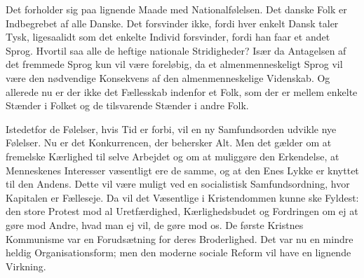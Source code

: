 \documentclass[12pt,a4paper,openany]{book}
\begin{document}
Det forholder sig paa lignende Maade med Nationalfølelsen. Det danske Folk er
Indbegrebet af alle Danske. Det forsvinder ikke, fordi hver enkelt Dansk taler
Tysk, ligesaalidt som det enkelte Individ forsvinder, fordi han faar et andet
Sprog. Hvortil saa alle de heftige nationale Stridigheder? Især da Antagelsen
af det fremmede Sprog kun vil være foreløbig, da et almenmenneskeligt Sprog vil
være den nødvendige Konsekvens af den almenmenneskelige Videnskab. Og allerede
nu er der ikke det Fællesskab indenfor et Folk, som der er mellem enkelte
Stænder i Folket og de tilsvarende Stænder i andre Folk.

Istedetfor de Følelser, hvis Tid er forbi, vil en ny Samfundsorden udvikle nye
Følelser. Nu er det Konkurrencen, der behersker Alt. Men det gælder om at
fremelske Kærlighed til selve Arbejdet og om at muliggøre den Erkendelse, at
Menneskenes Interesser væsentligt ere de samme, og at den Enes Lykke er knyttet
til den Andens. Dette vil være muligt ved en socialistisk Samfundsordning, hvor
Kapitalen er Fælleseje. Da vil det Væsentlige i Kristendommen kunne ske
Fyldest: den store Protest mod al Uretfærdighed, Kærlighedsbudet og Fordringen
om ej at gøre mod Andre, hvad man ej vil, de gøre mod os. De første Kristnes
Kommunisme var en Forudsætning for deres Broderlighed. Det var nu en mindre
heldig Organisationsform; men den moderne sociale Reform vil have en lignende
Virkning.
\end{document}
